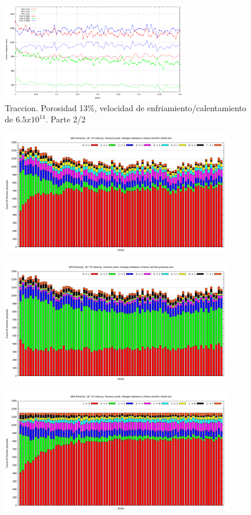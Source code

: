 \documentclass[10pt, oneside]{article} %
\begin{document}
\begin{figure}[H]
\centering
\includegraphics[width=8cm]{Figures/Porosidad_2vel_voronoi_13_14_trac2.png}
\caption{Traccion. Porosidad 13\%, velocidad de enfriamiento/calentamiento de $6.5x10^{14}$. Parte 2/2}
\label{fg:11trac}
\end{figure}

\begin{figure}[H]
\centering
\includegraphics[width=10cm]{Figures/Porosidad_2vel_trac_voronoi_hist1.png}
\caption{}
\end{figure}

\begin{figure}[H]
\centering
\includegraphics[width=10cm]{Figures/Porosidad_2vel_trac_voronoi_hist2.png}
\caption{}
\end{figure}

\begin{figure}[H]
\centering
\includegraphics[width=10cm]{Figures/Porosidad_2vel_trac_voronoi_hist3.png}
\caption{}
\end{figure}
\end{document}
